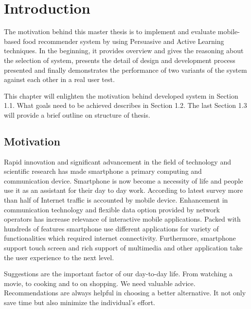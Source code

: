 \chapter{Introduction}
\setcounter{page}{1}%
\thispagestyle{empty}

The motivation behind this master thesis is to implement and evaluate mobile-based food recommender system by using Persuasive and Active Learning techniques. In the beginning, it provides overview and gives the reasoning about the selection of system, presents the detail of design and development process presented and finally demonstrates the performance of two variants of the system against each other in a real user test. \newline

This chapter will enlighten the motivation behind developed system in Section 1.1.  What goals need to be achieved describes in Section 1.2. The last Section 1.3 will provide a brief outline on structure of thesis.

\section{Motivation}\label{motivation}

Rapid innovation and significant advancement in the field of technology and scientific research has made smartphone a primary computing and communication device. Smartphone is now become a necessity of life and people use it as an assistant for their day to day work. According to latest survey more than half of Internet traffic is accounted by mobile device. Enhancement in communication technology and flexible data option provided by network operators has increase relevance of interactive mobile applications. Packed with hundreds of features smartphone use different applications for variety of functionalities which required internet connectivity. Furthermore, smartphone support touch screen and rich support of multimedia and other application take the user experience to the next level.\newline

Suggestions are the important factor of our day-to-day life. From watching a movie, to cooking and to on shopping. We need valuable advice. Recommendations are always helpful in choosing a better alternative. It not only save time but also minimize the individual's effort.\newline


